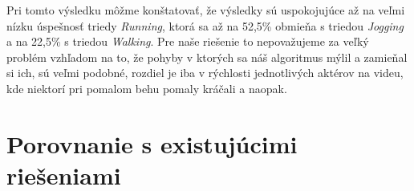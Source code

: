 Pri tomto výsledku môžme konštatovať, že výsledky sú uspokojujúce až na veľmi nízku úspešnosť triedy \textit{Running}, ktorá sa až na 52,5\% obmieňa s triedou \textit{Jogging} a na 22,5\% s triedou \textit{Walking}. Pre naše riešenie to nepovažujeme za veľký problém vzhľadom na to, že pohyby v ktorých sa náš algoritmus mýlil a zamieňal si ich, sú veľmi podobné, rozdiel je iba v rýchlosti jednotlivých aktérov na videu, kde niektorí pri pomalom behu pomaly kráčali a naopak. 



\section{Porovnanie s existujúcimi riešeniami}




